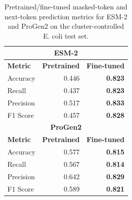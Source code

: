\begin{table}[t]
\centering
\caption{Pretrained/fine-tuned masked-token and next-token prediction metrics for ESM-2 and ProGen2 on the cluster-controlled E. coli test set.}
\label{tab:ecoli_token_prediction_metrics_cluster95}
\begin{tabular}{lrr}
\hline
\multicolumn{3}{c}{\textbf{ESM-2}} \\
\hline
\textbf{Metric} & \textbf{Pretrained} & \textbf{Fine-tuned} \\
\hline
Accuracy & 0.446 & \textbf{0.823} \\
Recall & 0.437 & \textbf{0.823} \\
Precision & 0.517 & \textbf{0.833} \\
F1 Score & 0.457 & \textbf{0.828} \\
\hline
\multicolumn{3}{c}{\textbf{ProGen2}} \\
\hline
\textbf{Metric} & \textbf{Pretrained} & \textbf{Fine-tuned} \\
\hline
Accuracy & 0.577 & \textbf{0.815} \\
Recall & 0.567 & \textbf{0.814} \\
Precision & 0.642 & \textbf{0.829} \\
F1 Score & 0.589 & \textbf{0.821} \\
\hline
\end{tabular}
\end{table}
